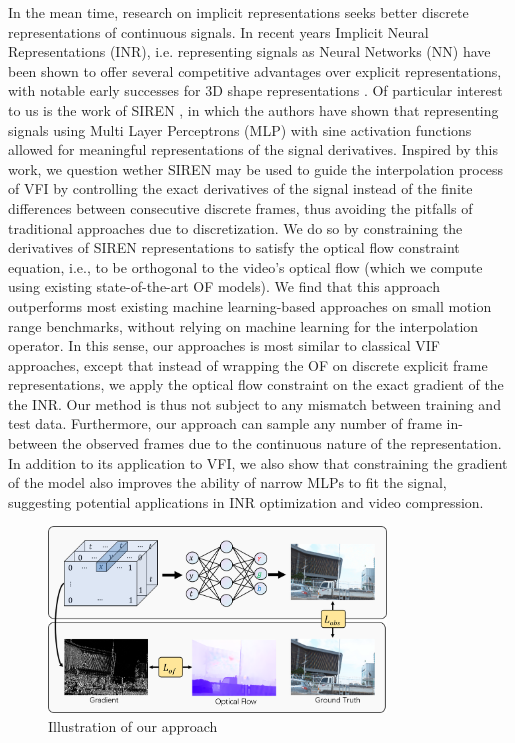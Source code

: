 \documentclass{article}
\begin{document}
In the mean time, research on implicit representations seeks better discrete representations of continuous signals.
In recent years Implicit Neural Representations (INR), i.e. representing signals as Neural Networks (NN)
have been shown to offer several competitive advantages over explicit representations,
with notable early successes for 3D shape representations \cite{mildenhall2020nerf}.
Of particular interest to us is the work of SIREN \cite{sitzmann2020implicit},
in which the authors have shown that representing
signals using Multi Layer Perceptrons (MLP) with sine activation functions
allowed for meaningful representations of the signal derivatives.
Inspired by this work, we question wether SIREN may be used to guide the interpolation
process of VFI by controlling the exact derivatives of the signal instead of the finite differences
between consecutive discrete frames, thus avoiding the pitfalls of traditional approaches due to discretization.
We do so by constraining the derivatives of SIREN representations to satisfy the optical flow constraint equation,
i.e., to be orthogonal to the video's optical flow
(which we compute using existing state-of-the-art OF models).
We find that this approach outperforms most existing
machine learning-based approaches on small motion range benchmarks,
without relying on machine learning for the interpolation operator.
In this sense, our approaches is most similar to classical VIF approaches,
except that instead of wrapping the OF on discrete explicit frame representations,
we apply the optical flow constraint on the exact gradient of the the INR.
Our method is thus not subject to any mismatch between training and test data.
Furthermore, our approach can sample any number of frame in-between the observed frames
due to the continuous nature of the representation.
In addition to its application to VFI, we also show that constraining the gradient
of the model also improves the ability of narrow MLPs to fit the signal,
suggesting potential applications in INR optimization and video compression.

\begin{figure}[h]
\centering
\includegraphics[width=0.8\textwidth]{Method}
\caption{Illustration of our approach}
\end{figure}
\end{document}
